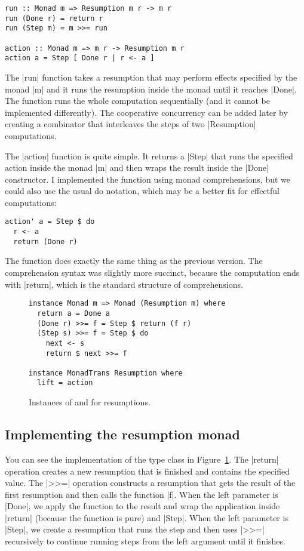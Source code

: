 \documentclass{tmr}
\begin{document}
\begin{verbatim}
run :: Monad m => Resumption m r -> m r
run (Done r) = return r
run (Step m) = m >>= run

action :: Monad m => m r -> Resumption m r
action a = Step [ Done r | r <- a ]
\end{verbatim}
The |run| function takes a resumption that may perform effects specified by the monad |m| and it
runs the resumption inside the monad until it reaches |Done|. The function runs the whole 
computation sequentially (and it cannot be implemented differently). The cooperative concurrency
can be added later by creating a combinator that interleaves the steps of two |Resumption|
computations.

The |action| function is quite simple. It returns a |Step| that runs the specified action 
inside the monad |m| and then wraps the result inside the |Done| constructor. I implemented the
function using monad comprehensions, but we could also use the usual do notation, which may be
a better fit for effectful computations:

\begin{verbatim}
action' a = Step $ do 
  r <- a
  return (Done r)
\end{verbatim}
The function does exactly the same thing as the previous version. The comprehension syntax was 
slightly more succinct, because the computation ends with |return|, which is the standard structure
of comprehensions.


\begin{figure}
\begin{verbatim}
instance Monad m => Monad (Resumption m) where
  return a = Done a
  (Done r) >>= f = Step $ return (f r)
  (Step s) >>= f = Step $ do
    next <- s
    return $ next >>= f

instance MonadTrans Resumption where
  lift = action
\end{verbatim}
\caption{Instances of  and  
  for resumptions.}
\label{fig:poorman-instance}
\end{figure}

\subsection{Implementing the resumption monad}
You can see the implementation of the  type class in 
Figure~\ref{fig:poorman-instance}. The |return| operation creates a new resumption that is finished
and contains the specified value. The |>>=| operation constructs a resumption that gets the result
of the first resumption and then calls the function |f|. When the left parameter is |Done|, we 
apply the function to the result and wrap the application inside |return| (because the function
is pure) and |Step|. When the left parameter is |Step|, we create a resumption that runs the
step and then uses |>>=| recursively to continue running steps from the left argument until it 
finishes.
\end{document}
